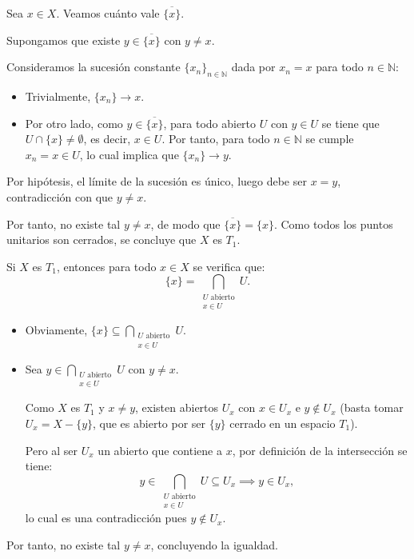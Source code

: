 \begin{sol}
Sea $x \in X$. Veamos cuánto vale $\overline{\{x\}}$.

Supongamos que existe $y \in \overline{\{x\}}$ con $y \ne x$.

Consideramos la sucesión constante $\{x_n\}_{n \in \mathbb{N}}$ dada por $x_n = x$ para todo $n \in \mathbb{N}$:
\begin{itemize}
    \item Trivialmente, $\{x_n\} \longrightarrow x$.
    \item Por otro lado, como $y \in \overline{\{x\}}$, para todo abierto $U$ con $y \in U$ se tiene que $U \cap \{x\} \ne \emptyset$, es decir, $x \in U$. Por tanto, para todo $n \in \mathbb{N}$ se cumple $x_n = x \in U$, lo cual implica que $\{x_n\} \longrightarrow y$.
\end{itemize}

Por hipótesis, el límite de la sucesión es único, luego debe ser $x = y$, contradicción con que $y \ne x$.

Por tanto, no existe tal $y \ne x$, de modo que $\overline{\{x\}} = \{x\}$. Como todos los puntos unitarios son cerrados, se concluye que $X$ es $T_1$.
\end{sol}

\bigskip

\begin{ejer}[76]
Si $X$ es $T_1$, entonces para todo $x \in X$ se verifica que:
\[
    \{x\} = \bigcap_{\substack{U \text{ abierto} \\ x \in U}} U.
\]
\end{ejer}

\begin{sol}
\begin{itemize}
    \item[$\subseteq)$] Obviamente, $\{x\} \subseteq \displaystyle\bigcap_{\substack{U \text{ abierto} \\ x \in U}} U$.
    
    \item[$\supseteq)$] Sea $y \in \displaystyle\bigcap_{\substack{U \text{ abierto} \\ x \in U}} U$ con $y \ne x$.
    
    Como $X$ es $T_1$ y $x \ne y$, existen abiertos $U_x$ con $x \in U_x$ e $y \notin U_x$ (basta tomar $U_x = X - \{y\}$, que es abierto por ser $\{y\}$ cerrado en un espacio $T_1$).
    
    Pero al ser $U_x$ un abierto que contiene a $x$, por definición de la intersección se tiene:
    \[
        y \in \bigcap_{\substack{U \text{ abierto} \\ x \in U}} U \subseteq U_x \implies y \in U_x,
    \]
    lo cual es una contradicción pues $y \notin U_x$.
\end{itemize}
Por tanto, no existe tal $y \ne x$, concluyendo la igualdad.
\end{sol}

